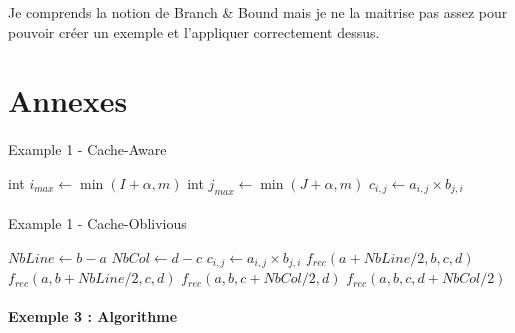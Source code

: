 \documentclass[
  paper=a4,
  ,captions=tableheading
]{scrartcl}
\begin{document}
Je comprends la notion de Branch \& Bound mais je ne la maitrise pas
assez pour pouvoir créer un exemple et l'appliquer correctement dessus.

\hypertarget{annexes}{%
\section{Annexes}\label{annexes}}

\hypertarget{algorithm5}{%
\paragraph{}\label{algorithm5}}

\begin{algorithm}[H]
\caption{Example 1 - Cache-Aware}
\begin{algorithmic}[2]
\Statex
 
    \State int $i_{max} \gets \min(I+\alpha, m)$
      \State int $j_{max} \gets \min(J+\alpha, m)$
        \State $c_{i,j} \gets a_{i,j} \times b_{j,i}$
        \EndFor
      \EndFor
    \EndFor
  \EndFor
\end{algorithmic}
\end{algorithm}

\hypertarget{algorithm6}{%
\paragraph{}\label{algorithm6}}

\begin{algorithm}[H]
\caption{Example 1 - Cache-Oblivious}
\begin{algorithmic}[3]
\Statex
{}
  \State $NbLine \gets b-a$
  \State $NbCol \gets d-c$
        \State $c_{i,j} \gets a_{i,j} \times b_{j,i}$
      \EndFor
    \EndFor
  \Else
      \State $f_{rec}(a+NbLine/2, b, c, d)$
      \State $f_{rec}(a, b+NbLine/2, c, d)$
    \Else
      \State $f_{rec}(a, b, c+NbCol/2, d)$
      \State $f_{rec}(a, b, c, d+NbCol/2)$
    \EndIf
  \EndIf
\EndFunction
\end{algorithmic}
\end{algorithm}

\hypertarget{exemple-3-algorithme}{%
\paragraph{Exemple 3 : Algorithme}\label{exemple-3-algorithme}}

\hypertarget{exemple3}{%
\paragraph{}\label{exemple3}}


\end{document}
